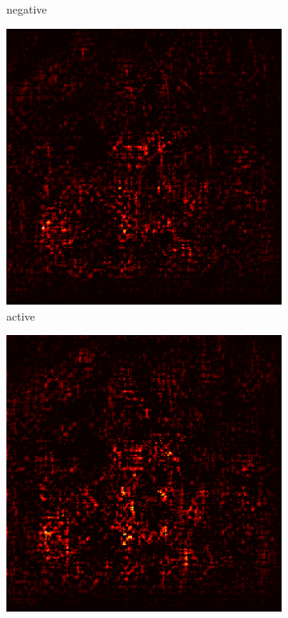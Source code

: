 \documentclass[preprint,12pt]{elsarticle}
\begin{document}
\begin{figure}
\begin{subfigure}{0.14\textwidth}
        \caption{negative}
    \end{subfigure}
    \hfill
    \begin{subfigure}{0.14\textwidth}
        \centering
        \includegraphics[width=\linewidth]{../visualizations/examples/imagenette/resnet18/active_saliency_map/0.png}
        \caption{active}
    \end{subfigure}
    \hfill
    \begin{subfigure}{0.14\textwidth}
        \centering
        \includegraphics[width=\linewidth]{../visualizations/examples/imagenette/resnet18/inactive_saliency_map/0.png}

\end{subfigure}
\end{figure}
\end{document}
